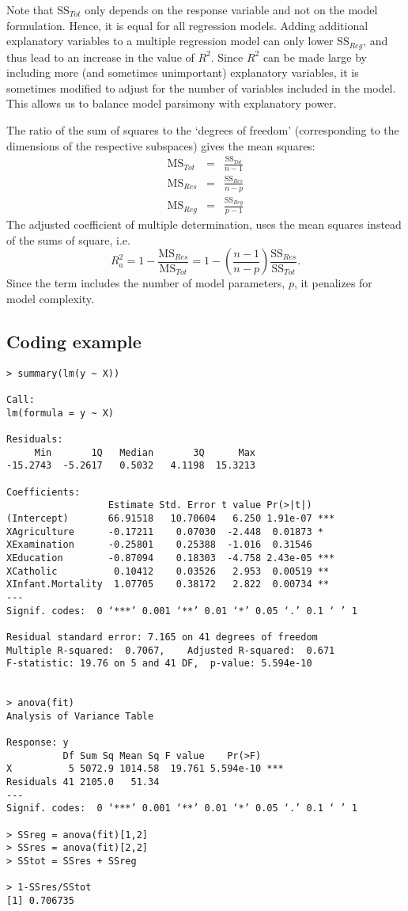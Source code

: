 Note that $\mbox{SS}_{Tot}$ only depends on the response variable and not on the model formulation. 
Hence, it is equal for all regression models. Adding additional explanatory variables to a multiple regression model can only lower $\mbox{SS}_{Reg}$, and thus lead to an increase in the value of $R^2$.
Since $R^2$ can be made large by including more (and sometimes unimportant) explanatory variables, it is sometimes modified to adjust for the number of variables included in the model.
This allows us to balance model parsimony with explanatory power.

The ratio of the sum of squares to the `degrees of freedom' (corresponding to the dimensions of the respective subspaces) gives the mean squares:
\begin{eqnarray*}
\mbox{MS}_{Tot} &=& \frac{ \mbox{SS}_{Tot} }{n-1} \\
\mbox{MS}_{Res} &=& \frac{ \mbox{SS}_{Res} }{n-p} \\
\mbox{MS}_{Reg} &=& \frac{ \mbox{SS}_{Reg} }{p-1}
\end{eqnarray*}
The adjusted coefficient of multiple determination, uses the mean squares instead of the sums of square, i.e.
$$
R_a^2 = 1 - \frac{\mbox{MS}_{Res}}{\mbox{MS}_{Tot}} = 1 - \left( \frac{n-1}{n-p} \right) \frac{\mbox{SS}_{Res}}{\mbox{SS}_{Tot}}.
$$
Since the term includes the number of model parameters, $p$, it penalizes for model complexity.


\subsection{Coding example}

\begin{verbatim}
> summary(lm(y ~ X))

Call:
lm(formula = y ~ X)

Residuals:
     Min       1Q   Median       3Q      Max 
-15.2743  -5.2617   0.5032   4.1198  15.3213 

Coefficients:
                  Estimate Std. Error t value Pr(>|t|)    
(Intercept)       66.91518   10.70604   6.250 1.91e-07 ***
XAgriculture      -0.17211    0.07030  -2.448  0.01873 *  
XExamination      -0.25801    0.25388  -1.016  0.31546    
XEducation        -0.87094    0.18303  -4.758 2.43e-05 ***
XCatholic          0.10412    0.03526   2.953  0.00519 ** 
XInfant.Mortality  1.07705    0.38172   2.822  0.00734 ** 
---
Signif. codes:  0 ‘***’ 0.001 ‘**’ 0.01 ‘*’ 0.05 ‘.’ 0.1 ‘ ’ 1

Residual standard error: 7.165 on 41 degrees of freedom
Multiple R-squared:  0.7067,	Adjusted R-squared:  0.671 
F-statistic: 19.76 on 5 and 41 DF,  p-value: 5.594e-10


> anova(fit)
Analysis of Variance Table

Response: y
          Df Sum Sq Mean Sq F value    Pr(>F)    
X          5 5072.9 1014.58  19.761 5.594e-10 ***
Residuals 41 2105.0   51.34                      
---
Signif. codes:  0 ‘***’ 0.001 ‘**’ 0.01 ‘*’ 0.05 ‘.’ 0.1 ‘ ’ 1

> SSreg = anova(fit)[1,2]
> SSres = anova(fit)[2,2]
> SStot = SSres + SSreg

> 1-SSres/SStot
[1] 0.706735
\end{verbatim}

